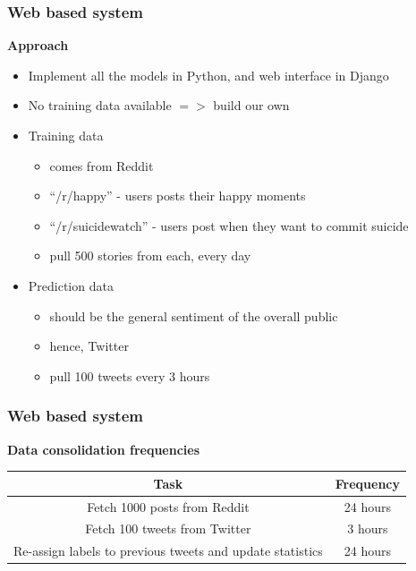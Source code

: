 \documentclass[9pt]{beamer}
\begin{document}
    \begin{frame}
        \frametitle{Web based system}
        \begin{center}
            \textbf{Approach}
        \end{center}
        \begin{itemize}
            \item{Implement all the models in Python, and web interface in Django}
            \item{No training data available $=>$ build our own}
            \item{
            Training data
            \begin{itemize}
                \item{comes from Reddit}
                \item{``/r/happy'' - users posts their happy moments}
                \item{``/r/suicidewatch'' - users post when they want to commit suicide}
                \item{pull 500 stories from each, every day}
            \end{itemize}
            }
            \item{
            Prediction data
            \begin{itemize}
                \item{should be the general sentiment of the overall public}
                \item{hence, Twitter}
                \item{pull 100 tweets every 3 hours}
            \end{itemize}
            }
        \end{itemize}
    \end{frame}
    
    \begin{frame}
        \frametitle{Web based system}
        \begin{center}
            \textbf{Data consolidation frequencies}
        \end{center}
        \begin{table}
            \begin{center}
                \begin{tabular}{ | c | c | }
                    \hline
                    \textbf{Task} & \textbf{Frequency} \\
                    \hline
                    Fetch 1000 posts from Reddit & 24 hours \\
                    \hline
                    Fetch 100 tweets from Twitter & 3 hours \\
                    \hline
                    Re-assign labels to previous tweets and update statistics & 24 hours \\
                    \hline
                \end{tabular}
            \end{center}
        \end{table}
    \end{frame}
    
\end{document}
